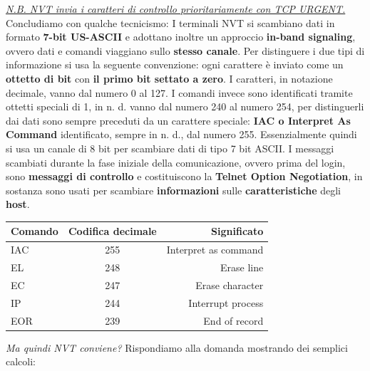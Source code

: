 \documentclass[11pt,a4paper]{article}
\theoremstyle{definition}
\begin{document}
\underline{\textit{N.B. NVT invia i caratteri di controllo prioritariamente con TCP URGENT.}}
\newpage
Concludiamo con qualche tecnicismo: \newline\newline
I terminali NVT si scambiano dati in formato \textbf{7-bit US-ASCII} e adottano inoltre un approccio \textbf{in-band signaling}, ovvero dati e comandi viaggiano sullo \textbf{stesso canale}. Per distinguere i due tipi di informazione si usa la seguente convenzione: ogni carattere è inviato come un \textbf{ottetto di bit} con \textbf{il primo bit settato a zero}. I caratteri, in notazione decimale, vanno dal numero 0 al 127. I comandi invece sono identificati tramite  ottetti speciali di 1, in n. d. vanno dal numero 240 al numero 254, per distinguerli dai dati sono sempre preceduti da un carattere speciale: \textbf{IAC o Interpret As Command} identificato, sempre in n. d., dal numero 255. Essenzialmente quindi si usa un canale di 8 bit per scambiare dati di tipo 7 bit ASCII. I messaggi scambiati durante la fase iniziale della comunicazione, ovvero prima del login, sono \textbf{messaggi di controllo} e costituiscono la \textbf{Telnet Option Negotiation}, in sostanza sono usati per scambiare \textbf{informazioni} sulle \textbf{caratteristiche} degli \textbf{host}.
\begin{table}[h!]
	\begin{center}
		\label{tab:table1}
		\begin{tabular}{l|c|r}
			\textbf{Comando} & \textbf{Codifica decimale} & \textbf{Significato} \\
			\hline
			IAC              & 255                        & Interpret as command \\
			EL               & 248                        & Erase line           \\
			EC               & 247                        & Erase character      \\
			IP               & 244                        & Interrupt process    \\
			EOR              & 239                        & End of record        \\
		\end{tabular}
	\end{center}
\end{table}\newline
\textit{Ma quindi NVT conviene?}\newline\newline
Rispondiamo alla domanda mostrando dei semplici calcoli:\newline\newline
\end{document}
